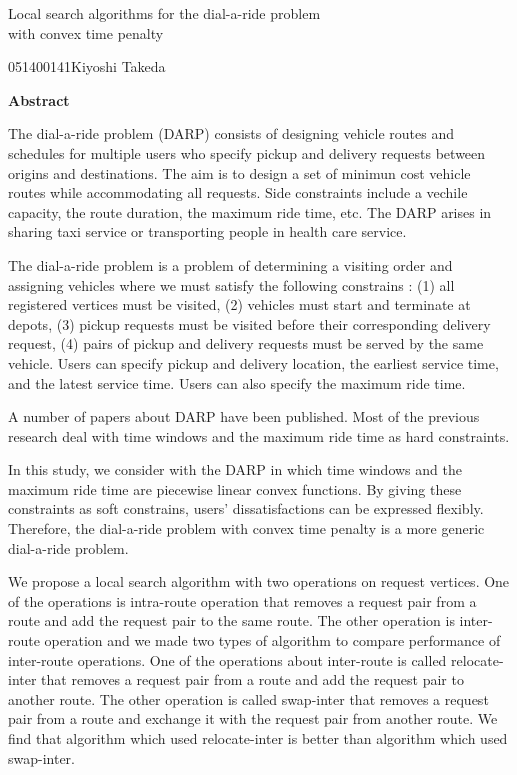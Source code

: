 

\newpage
\begin{center}{\LARGE Local  search algorithms for the dial-a-ride problem\\ with convex time penalty}\\[0.5cm]
\end{center}
\hfill {\large 051400141\qquad Kiyoshi Takeda}\\[0.5cm]
\begin{center}
{\large \bf Abstract}\\
\end{center}
The dial-a-ride problem (DARP) consists of designing vehicle routes and schedules for multiple users who specify pickup and delivery requests between origins and destinations. The aim is to design a set of minimun cost vehicle routes while accommodating all requests. Side constraints include a vechile capacity, the route duration, the maximum ride time, etc. The DARP arises in sharing taxi service or transporting people in health care service.

The dial-a-ride problem is a problem of determining a visiting order and assigning vehicles where we must satisfy the following constrains : (1) all registered vertices must be visited, (2) vehicles must start and terminate at depots, (3) pickup requests must be visited before their corresponding delivery request, (4) pairs of pickup and delivery requests must be served by the same vehicle.  Users can specify pickup and delivery location, the earliest service time, and the latest service time. Users can also specify the maximum ride time.

A number of papers about DARP have been published. Most of the previous research deal with time windows and the maximum ride time as hard constraints.

In this study, we consider with the DARP in which time windows and the maximum ride time are piecewise linear convex functions. By giving these constraints as soft constrains, users' dissatisfactions can be expressed flexibly. Therefore, the dial-a-ride problem with convex time penalty is a more generic dial-a-ride problem.

We propose a local search algorithm with two operations on request vertices. One of the operations is intra-route operation that removes a request pair from a route and add the request pair to the same route. The other operation is inter-route operation and we made two types of algorithm to compare performance of inter-route operations.
One of the operations about inter-route is called relocate-inter  that removes a request pair from a route and add the request pair to another route. The other operation is called swap-inter that removes a request pair from a route and exchange it with the request pair from another route.
We find that algorithm which used relocate-inter is better than algorithm which used swap-inter.

